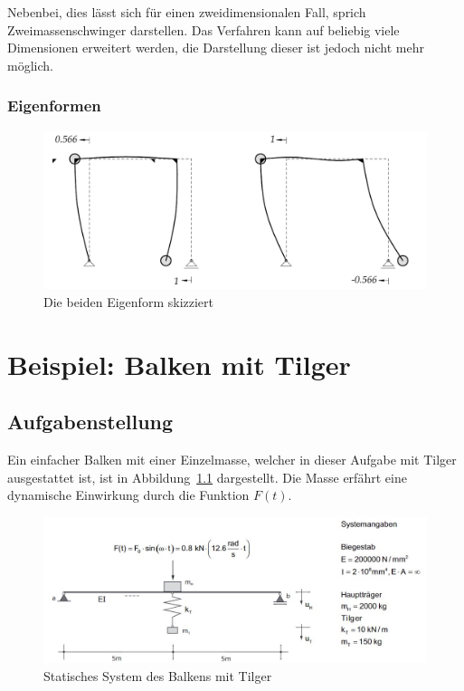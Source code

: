 \documentclass[
  letterpaper,
  DIV=11]{scrreprt}
\begin{document}
Nebenbei, dies lässt sich für einen zweidimensionalen Fall, sprich
Zweimassenschwinger darstellen. Das Verfahren kann auf beliebig viele
Dimensionen erweitert werden, die Darstellung dieser ist jedoch nicht
mehr möglich.

\hypertarget{eigenformen-1}{%
\subsection{Eigenformen}\label{eigenformen-1}}

\begin{figure}[H]

{\centering \includegraphics{index_files/mediabag/bilder/aufgabe_mms_nach_eigenvekt1.pdf}

}

\caption{\label{fig-mms_nach_eigenformen}Die beiden Eigenform skizziert}

\end{figure}

\hypertarget{sec-tilger}{%
\chapter{Beispiel: Balken mit Tilger}\label{sec-tilger}}

\hypertarget{aufgabenstellung-12}{%
\section{Aufgabenstellung}\label{aufgabenstellung-12}}

Ein einfacher Balken mit einer Einzelmasse, welcher in dieser Aufgabe
mit Tilger ausgestattet ist, ist in Abbildung~\ref{fig-tilger}
dargestellt. Die Masse erfährt eine dynamische Einwirkung durch die
Funktion \(F(t)\).

\begin{figure}[H]

{\centering \includegraphics{bilder/mms4system.jpg}

}

\caption{\label{fig-tilger}Statisches System des Balkens mit Tilger}

\end{figure}
\end{document}
